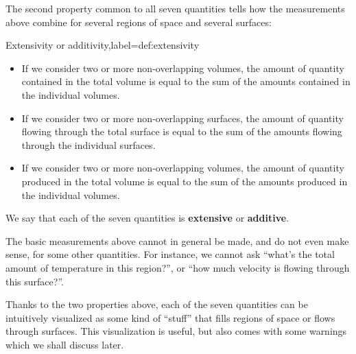 \documentclass[a4paper,12pt,%
onecolumn,oneside,%
british%
]{memoir}
\renewcommand*{\|}[1][]{\nonscript\:#1\vert\nonscript\:\mathopen{}}
\begin{document}
The second property common to all seven quantities tells how the measurements above combine for several regions of space and several surfaces:
\begin{definition}{Extensivity or additivity,label={def:extensivity}}
\begin{itemize}[leftmargin=17.62pt]
\item If we consider two or more non-overlapping volumes, the amount of quantity contained in the total volume is equal to the sum of the amounts contained in the individual volumes.

\item If we consider two or more non-overlapping surfaces, the amount of quantity flowing through the total surface is equal to the sum of the amounts flowing through the individual surfaces.

\item If we consider two or more non-overlapping volumes, the amount of quantity produced in the total volume is equal to the sum of the amounts produced in the individual volumes.
  \end{itemize}

We say that each of the seven quantities is \textbf{extensive} or \textbf{additive}.
\end{definition}



\medskip

The basic measurements above cannot in general be made, and do not even make sense, for some other quantities. For instance, we cannot ask \enquote{what's the total amount of temperature in this region?}, or \enquote{how much velocity is flowing through this surface?}.

\medskip

Thanks to the two properties above, each of the seven quantities can be intuitively visualized as some kind of \enquote{stuff} that fills regions of space or flows through surfaces. This visualization is useful, but also comes with some warnings which we shall discuss later.

\end{document}
